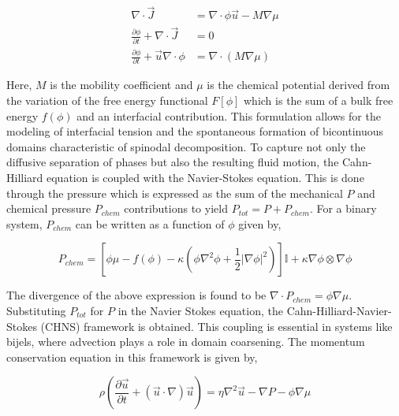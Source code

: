 \begin{equation}
    \begin{split}
        \nabla \cdot \vec{J} &= \nabla \cdot \phi\vec{u} - M \nabla \mu \\
        \frac{\partial \phi}{\partial t} + \nabla \cdot \vec{J} &= 0 \\
        \frac{\partial \phi}{\partial t} + \vec{u}\nabla \cdot \phi &= \nabla \cdot \left( M \nabla \mu \right)
    \end{split}
\end{equation}

Here, $M$ is the mobility coefficient and $\mu$ is the chemical potential derived from the variation of the free energy functional $F[\phi]$ which is the sum of a bulk free energy
$f(\phi)$ and an interfacial contribution. This formulation allows for the modeling of interfacial tension and the spontaneous formation of bicontinuous domains characteristic of spinodal decomposition.
To capture not only the diffusive separation of phases but also the resulting fluid motion, the Cahn-Hilliard equation is coupled with the Navier-Stokes equation. This is done
through the pressure which is expressed as the sum of the mechanical $P$ and chemical pressure $P_{chem}$ contributions to yield $P_{tot} = P + P_{chem}$. For a binary system, $P_{chem}$ 
can be written as a function of $\phi$ given by,

\begin{equation}
    P_{chem} = \left[ \phi \mu - f(\phi) - \kappa(\phi \nabla^2 \phi + \frac{1}{2}|\nabla \phi |^2 )\right] \mathbb{I} + \kappa \nabla \phi \otimes \nabla \phi
\end{equation}

The divergence of the above expression is found to be $\nabla \cdot P_{chem} = \phi \nabla \mu$. Substituting $P_{tot}$ for $P$ in the Navier Stokes equation,
the Cahn-Hilliard-Navier-Stokes (CHNS) framework is obtained. This coupling is essential in systems like bijels, where advection plays a role in domain 
coarsening. The momentum conservation equation in this framework is given by,

\begin{equation}
    \rho \left(\frac{\partial\vec{u}}{\partial t} + (\vec{u}\cdot\nabla)\vec{u} \right) = \eta \nabla^2 \vec{u} - \nabla P - \phi \nabla \mu
\end{equation}


